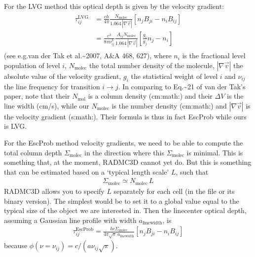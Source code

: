 \documentclass[letterpaper,10pt,english]{sphinxmanual}
\begin{document}
For the LVG method this optical depth is given by the velocity gradient:
\begin{equation*}
\begin{split}\begin{split}
\tau_{ij}^{\mathrm{LVG}} & = \frac{ch}{4\pi}\frac{N_{\mathrm{molec}}}
{1.064\,|\nabla \vec v|}\left[n_jB_{ji}-n_iB_{ij}\right]\\
&= \frac{c^3}{8\pi \nu_{ij}^3}\frac{A_{ij}N_{\mathrm{molec}}}
{1.064\,|\nabla \vec v|}\left[\frac{g_i}{g_j}n_j-n_i\right]
\end{split}\end{split}
\end{equation*}
(see e.g.van der Tak et al.\textasciitilde{}2007, A\&A 468, 627), where \(n_i\) is the
fractional level population of level \(i\), \(N_{\mathrm{molec}}\) the
total number density of the molecule, \(|\nabla \vec v|\) the absolute value
of the velocity gradient, \(g_i\) the statistical weight of level \(i\)
and \(\nu_{ij}\) the line frequency for transition \(i\rightarrow
j\). In comparing to Eq.\textasciitilde{}21 of van der Tak’s paper, note that their
\(N_{\mathrm{mol}}\) is a column density (cm:math:) and their
\(\Delta V\) is the line width (cm/s), while our \(N_{\mathrm{molec}}\)
is the number density (cm:math:) and \(|\nabla \vec v|\) is the
velocity gradient (s:math:). Their formula is thus in fact EscProb while
ours is LVG.

For the EscProb method  velocity gradients, we need to be able to
compute the total column depth \(\Sigma_{\mathrm{molec}}\) in the direction
where this \(\Sigma_{\mathrm{molec}}\) is minimal. This is something that,
at the moment, RADMC\sphinxhyphen{}3D cannot yet do. But this is something that can be
estimated based on a ‘typical length scale’ \(L\), such that
\begin{equation*}
\begin{split}\Sigma_{\mathrm{molec}} \simeq N_{\mathrm{molec}}\, L\end{split}
\end{equation*}
RADMC\sphinxhyphen{}3D allows you to specify \(L\) separately for each cell (in the file
 or its binary version). The simplest would be to set
it to a global value equal to the typical size of the object we are interested
in. Then the line\sphinxhyphen{}center optical depth, assuming a Gaussian line profile with
width \(a_{\mathrm{linewidth}}\), is
\begin{equation*}
\begin{split}\tau_{ij}^{\mathrm{EscProb}} = \frac{hc \Sigma_{\mathrm{molec}}}{4\pi\sqrt{\pi}\,a_{\mathrm{linewidth}}}\left[n_jB_{ji}-n_iB_{ij}\right]\end{split}
\end{equation*}
because \(\phi(\nu=\nu_{ij})=c/(a\nu_{ij}\sqrt{\pi})\).
\end{document}
